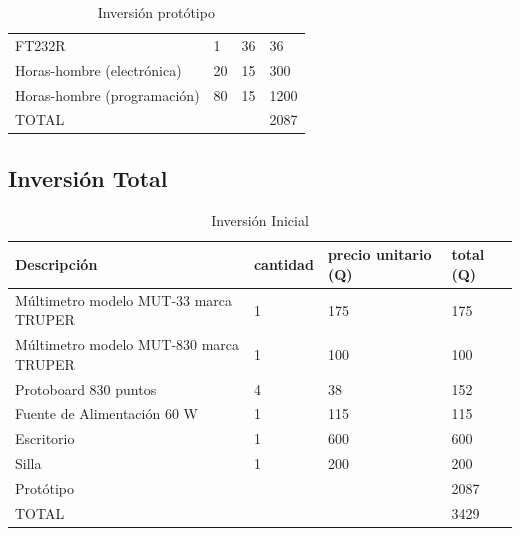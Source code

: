 \documentclass[oneside]{article}
\begin{document}
\begin{table}[H]
\begin{longtable}[c]{llll}
FT232R & 1 & 36 & 36 \\
Horas-hombre (electrónica) & 20 & 15 & 300 \\
Horas-hombre (programación) & 80 & 15 & 1200 \\
\hline
TOTAL & & & 2087 \\
\hline
 
\end{longtable}
\caption*{Inversión protótipo}
\end{table}


\subsection*{Inversión Total}
\begin{table}[H]
\centering
\begin{longtable}[c]{llll}
\toprule
Descripción & cantidad & precio unitario (Q) & total (Q) \\  
\midrule

Múltimetro modelo MUT-33 marca TRUPER & 1 & 175 & 175 \\
Múltimetro modelo MUT-830 marca TRUPER & 1 & 100 & 100 \\
Protoboard 830 puntos & 4 & 38 & 152 \\
Fuente de Alimentación 60 W & 1 & 115 & 115 \\
Escritorio & 1 & 600 & 600 \\
Silla & 1 & 200 & 200 \\
Protótipo & & & 2087 \\
\hline
TOTAL & & & 3429\\
\hline 

\end{longtable}
\caption*{Inversión Inicial }
\end{table}
\end{document}
